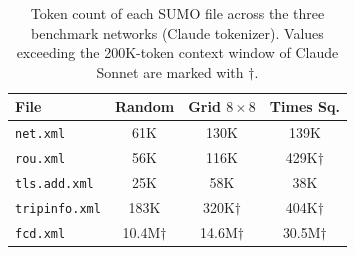 \begin{table}[t]
\centering
\caption{Token count of each SUMO file across the three benchmark networks
(Claude tokenizer).
Values exceeding the 200K-token context window of Claude Sonnet are
marked with $\dagger$.}
\label{tab:file_tokens}
\begin{tabular}{lccc}
\toprule
\textbf{File} & \textbf{Random} & \textbf{Grid $8\times8$} & \textbf{Times Sq.} \\
\midrule
\texttt{net.xml} & 61K & 130K & 139K \\
\texttt{rou.xml} & 56K & 116K & 429K$\dagger$ \\
\texttt{tls.add.xml} & 25K & 58K & 38K \\
\texttt{tripinfo.xml} & 183K & 320K$\dagger$ & 404K$\dagger$ \\
\texttt{fcd.xml} & 10.4M$\dagger$ & 14.6M$\dagger$ & 30.5M$\dagger$ \\
\bottomrule
\end{tabular}
\end{table}
